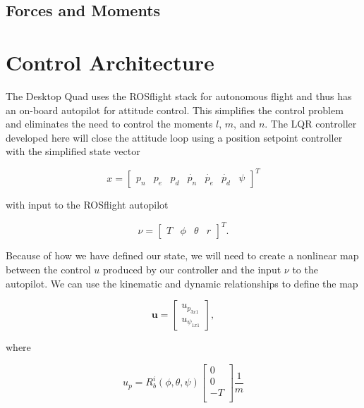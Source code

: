 \documentclass[dvips,12pt]{article}
\begin{document}
\subsection{Forces and Moments}

\section{Control Architecture}

The Desktop Quad uses the ROSflight \cite{rosflight} stack for autonomous flight and thus has an on-board autopilot for attitude control. This simplifies the control problem and eliminates the need to control the moments $l$, $m$, and $n$. The LQR controller developed here will close the attitude loop using a position setpoint controller with the simplified state vector

\singlespacing
\begin{equation*}
x =
\begin{bmatrix}
p_n & p_e & p_d & \dot{p_n} & \dot{p_e} & \dot{p_d} & \psi
\end{bmatrix}
^T
\end{equation*}
\doublespacing

\noindent with input to the ROSflight autopilot

\singlespacing
\begin{equation*}
\nu =
\begin{bmatrix}
T & \phi & \theta & r
\end{bmatrix}^T.
\end{equation*}
\doublespacing

Because of how we have defined our state, we will need to create a nonlinear map between the control $u$ produced by our controller and the input $\nu$ to the autopilot. We can use the kinematic and dynamic relationships to define the map

\begin{equation}
\boldsymbol{u} = 
\begin{bmatrix}
u_{p_{3x1}} \\
u_{{\psi}_{1x1}}
\end{bmatrix},
\end{equation}

\noindent where

\begin{equation}
u_p =
R_b^i(\phi, \theta, \psi)
\begin{bmatrix}
0  \\
0  \\
-T \\
\end{bmatrix}
\frac{1}{m}
\end{equation}
\end{document}
